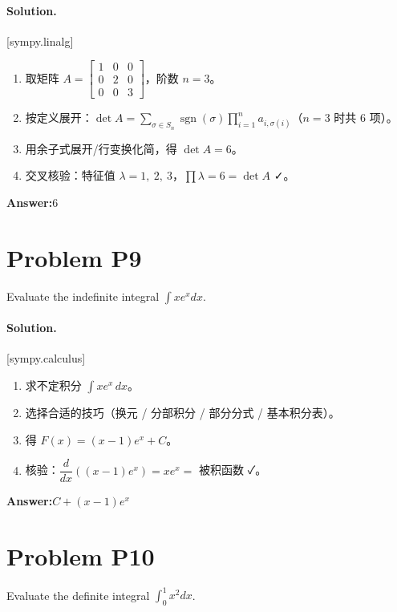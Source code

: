 \documentclass[11pt,a4paper]{ctexart}
\newcommand{\solvertag}[1]{{\footnotesize\color{gray}\textsf{[#1]}}}
\begin{document}
\paragraph{Solution.} \solvertag{sympy.linalg} 

\begin{enumerate}[leftmargin=*]
  \item 取矩阵 $A = \left[\begin{matrix}1 & 0 & 0\\0 & 2 & 0\\0 & 0 & 3\end{matrix}\right]$，阶数 $n = 3$。
  \item 按定义展开：$\det A = \sum_{\sigma \in S_n} \operatorname{sgn}(\sigma)\prod_{i=1}^{n} a_{i,\sigma(i)}$（$n=3$ 时共 $6$ 项）。
  \item 用余子式展开/行变换化简，得 $\det A = 6$。
  \item 交叉核验：特征值 $\lambda = 1,\ 2,\ 3$，$\prod \lambda = 6 = \det A$ ✓。
\end{enumerate}

\noindent\textbf{Answer:}\quad $6$

\medskip

\section*{Problem P9}
Evaluate the indefinite integral $\int x e^{x} dx$.

\paragraph{Solution.} \solvertag{sympy.calculus} 

\begin{enumerate}[leftmargin=*]
  \item 求不定积分 $\displaystyle\int x e^{x}\, dx$。
  \item 选择合适的技巧（换元 / 分部积分 / 部分分式 / 基本积分表）。
  \item 得 $F(x) = \left(x - 1\right) e^{x} + C$。
  \item 核验：$\dfrac{d}{dx}\left(\left(x - 1\right) e^{x}\right) = x e^{x} = $ 被积函数 ✓。
\end{enumerate}

\noindent\textbf{Answer:}\quad $C + \left(x - 1\right) e^{x}$

\medskip

\section*{Problem P10}
Evaluate the definite integral $\int_0^1 x^{2} dx$.
\end{document}

